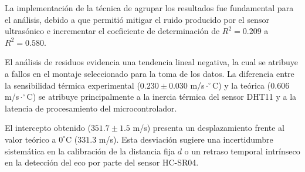 \documentclass[conference]{IEEEtran}
\begin{document}
La implementación de la técnica de agrupar los resultados fue fundamental para el análisis, debido a que permitió mitigar el ruido producido por el sensor ultrasónico e incrementar el coeficiente de determinación de $R^2 = 0.209$ a $R^2 = 0.580$.

El análisis de residuos evidencia una tendencia lineal negativa, la cual se atribuye a fallos en el montaje seleccionado para la toma de los datos. La diferencia entre la sensibilidad térmica experimental ($0.230 \pm 0.030$ m/s$\cdot^\circ$C) y la teórica ($0.606$ m/s$\cdot^\circ$C) se atribuye principalmente a la inercia térmica del sensor DHT11 y a la latencia de procesamiento del microcontrolador.

El intercepto obtenido ($351.7 \pm 1.5$ m/s) presenta un desplazamiento frente al valor teórico a $0^\circ\mathrm{C}$ ($331.3$ m/s). Esta desviación sugiere una incertidumbre sistemática en la calibración de la distancia fija $d$ o un retraso temporal intrínseco en la detección del eco por parte del sensor HC-SR04.



\end{document}
